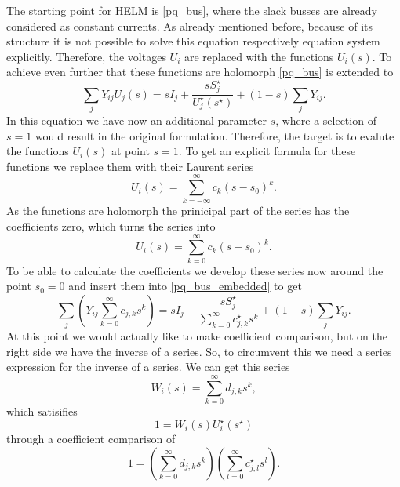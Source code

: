 The starting point for HELM is \eqref{pq_bus}, where the slack busses are already considered as constant currents. As already mentioned before, because of its structure it is not possible to solve this equation respectively equation system explicitly. Therefore, the voltages $U_i$ are replaced with the functions $U_i(s)$. To achieve even further that these functions are holomorph \citep{helmPatentSept2009} \eqref{pq_bus} is extended to
\begin{equation}	
		\sum_j Y_{ij} U_{j}(s) = s I_j + \frac{s S_j^\star}{U_j^\star(s^\star)} + (1 - s) \sum_j Y_{ij}.
		\label{eq:pq_bus_embedded}
\end{equation}
In this equation we have now an additional parameter $s$, where a selection of $s = 1$ would result in the original formulation. Therefore, the target is to evalute the functions $U_i(s)$ at point $s = 1$. To get an explicit formula for these functions we replace them with their Laurent series
\begin{equation}
	U_i(s) = \sum_{k = -\infty}^\infty c_k (s - s_0)^k.
\end{equation}
As the functions are holomorph the prinicipal part of the series has the coefficients zero, which turns the series into
\begin{equation}
	U_i(s) = \sum_{k = 0}^\infty c_k (s - s_0)^k.
\end{equation}
To be able to calculate the coefficients we develop these series now around the point $s_0 = 0$ and insert them into \eqref{pq_bus_embedded} to get
\begin{equation}
		\sum_j \left( Y_{ij} \sum_{k = 0}^\infty c_{j,k} s^k \right) = s I_j + \frac{s S_j^\star}{\sum_{k = 0}^\infty c_{j,k}^\star s^k} + (1 - s) \sum_j Y_{ij}.
		\label{eq:helm_series_pq_bus}
\end{equation}
At this point we would actually like to make coefficient comparison, but on the right side we have the inverse of a series. So, to circumvent this we need a series expression for the inverse of a series. We can get this series
\begin{equation}
	W_i(s) = \sum_{k = 0}^\infty d_{j,k} s^k,
\end{equation}
which satisifies
\begin{equation}
	1 = W_i(s) U_i^\star(s^\star)
\end{equation}
through a coefficient comparison of
\begin{equation}
	1 = \left( \sum_{k = 0}^\infty d_{j,k} s^k \right) \left( \sum_{l = 0}^\infty c_{j,l}^\star s^l \right).
\end{equation}
